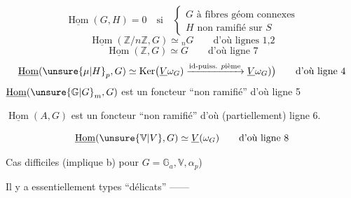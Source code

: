 \[
\underline{\operatorname{Hom}}(G,H)=0\quad\text{si}\quad
\left\{\begin{array}{l}G\text{ à fibres géom connexes}\\H\text{ non ramifié sur }S\end{array}\right.
\]
\[
\underline{\operatorname{Hom}}(\mathbb Z/n\mathbb Z,G)\simeq {}_nG\qquad\text{d'où lignes 1,2}
\]
\[
\underline{\operatorname{Hom}}(\mathbb Z,G)\simeq G\qquad\text{d'où ligne 7}
\]
\[
\underline{\operatorname{Hom}}(\unsure{\mu|H}_p,G)\simeq\operatorname{Ker}\bigl(\underline V\omega_G)\xrightarrow{\text{id-puiss. }p\text{ième}}\underline V\omega_G)\bigr)\qquad\text{d'où ligne 4}
\]
$\underline{\operatorname{Hom}}(\unsure{\mathbb G|G}_m,G)$ est un foncteur ``non ramifié'' d'où ligne 5

$\underline{\operatorname{Hom}}(A,G)$ est un foncteur ``non ramifié'' d'où (partiellement) ligne 6.

\[
\underline{\operatorname{Hom}}(\unsure{\mathbb V|V},G)\simeq\underline V(\omega_G)\qquad\text{d'où ligne 8}
\]

Cas difficiles
(implique b) pour $G=\mathbb G_a,\mathbb V,\alpha_p$)

Il y a essentiellement  types ``délicats'' ------
